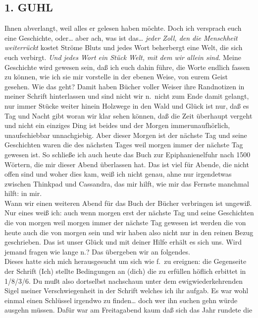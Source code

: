 \documentclass[
]{article}
\author{}
\date{\vspace{-2.5em}}
\begin{document}
\subsection{1. GUHL}\label{guhl}

Ihnen abverlangt, weil alles er gelesen haben möchte. Doch ich versprach
euch eine Geschichte, oder\ldots{} aber ach, was ist das\ldots{}
\emph{jeder Zoll, den die Menschheit weiterrückt }kostet Ströme Bluts
und jedes Wort beherbergt eine Welt, die sich euch verbirgt. \emph{Und
jedes Wort ein Stück Welt, mit dem wir allein sind. }Meine Geschichte
wird gewesen sein, daß ich euch dahin führe, die Worte endlich fassen zu
können, wie ich sie mir vorstelle in der ebenen Weise, von eurem Geist
gesehen. Wie das geht? Damit haben Bücher voller Weiser ihre Randnotizen
in meiner Schrift hinterlassen und sind nicht wir n.~nicht zum Ende
damit gelangt, nur immer Stücke weiter hinein Holzwege in den Wald und
Glück ist nur, daß es Tag und Nacht gibt woran wir klar sehen können,
daß die Zeit überhaupt vergeht und nicht ein einziges Ding ist beides
und der Morgen immerunaufhörlich, unaufschiebbar unnachgiebig. Aber
dieser Morgen ist der nächste Tag und seine Geschichten waren die des
nächsten Tages weil morgen immer der nächste Tag gewesen ist. So
schließe ich auch heute das Buch zur Epiphanienelfuhr nach 1500 Wörtern,
die mir dieser Abend überlassen hat. Das ist viel für Abende, die nicht
offen sind und woher dies kam, weiß ich nicht genau, ahne nur
irgendetwas zwischen Thinkpad und Cassandra, das mir hilft, wie mir das
Fernste manchmal hilft: in mir.\\
Wann wir einen weiteren Abend für das Buch der Bücher verbringen ist
ungewiß. Nur eines weiß ich: auch wenn morgen erst der nächste Tag und
seine Geschichten die von morgen weil morgen immer der nächste Tag
gewesen ist werden die von heute auch die von morgen sein und wir haben
also nicht nur in den reinen Bezug geschrieben. Das ist unser Glück und
mit deiner Hilfe erhält es sich uns. Wird jemand fragen wie lange n.?
Das übergeben wir an folgendes.\\
Dieses hatte sich mich herausgesucht um sich wie f.~zu ereignen: die
Gegenseite der Schrift (Ich) stellte Bedingungen an (dich) die zu
erfüllen höflich erbittet in 1/8/3/6. Du mußt also dortselbst nachschaun
unter dem ewigwiederkehrenden Sigel meiner Verschwiegenheit in der
Schrift welches ich ihr aufgab. Es war wohl einmal einen Schlüssel
irgendwo zu finden\ldots{} doch wer ihn suchen gehn würde ausgehn
müssen. Dafür war am Freitagabend kaum daß sich das Jahr rundete die
\end{document}
